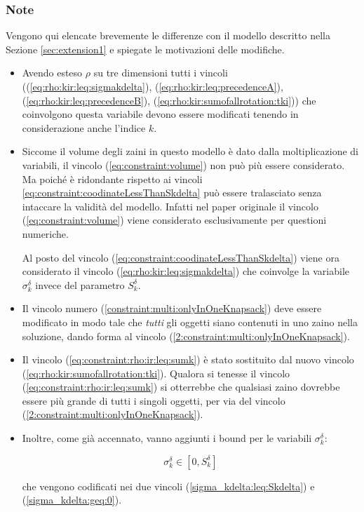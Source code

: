 \subsubsection{Note}
\label{sec:extension2:Note}
Vengono qui elencate brevemente le differenze con il modello descritto nella 
Sezione \ref{sec:extension1} e spiegate le motivazioni delle modifiche.
\begin{itemize}
\item Avendo esteso $\rho$ su tre dimensioni tutti i vincoli 
((\ref{eq:rho:kir:leq:sigmakdelta}), (\ref{eq:rho:kir:leq:precedenceA}), 
(\ref{eq:rho:kir:leq:precedenceB}), (\ref{eq:rho:kir:sumofallrotation:tki})) che
coinvolgono questa variabile devono essere modificati tenendo in considerazione
anche l'indice $k$.

\item Siccome il volume degli zaini in questo modello è dato dalla 
moltiplicazione di variabili, il vincolo
(\ref{eq:constraint:volume}) non può più essere considerato. 
Ma poiché è ridondante rispetto ai vincoli 
\ref{eq:constraint:coodinateLessThanSkdelta}
può essere tralasciato senza intaccare la validità del modello.
Infatti nel paper originale il vincolo (\ref{eq:constraint:volume}) viene 
considerato esclusivamente per questioni numeriche.

Al posto del vincolo (\ref{eq:constraint:coodinateLessThanSkdelta}) viene ora 
considerato il vincolo 
(\ref{eq:rho:kir:leq:sigmakdelta}) che coinvolge la variabile $\sigma_k^\delta$
invece del parametro $S_k^\delta$.

\item Il vincolo numero (\ref{constraint:multi:onlyInOneKnapsack}) deve essere 
modificato in modo tale che \emph{tutti} gli oggetti siano contenuti in uno 
zaino nella soluzione, dando forma al vincolo 
(\ref{2:constraint:multi:onlyInOneKnapsack}).

\item Il vincolo (\ref{eq:constraint:rho:ir:leq:sumk}) è stato sostituito dal
nuovo vincolo (\ref{eq:rho:kir:sumofallrotation:tki}). Qualora si tenesse il
vincolo (\ref{eq:constraint:rho:ir:leq:sumk}) si otterrebbe che qualsiasi zaino
 dovrebbe essere più grande di tutti i singoli oggetti, per via  del vincolo
 (\ref{2:constraint:multi:onlyInOneKnapsack}).

\item Inoltre, come già accennato, vanno aggiunti i bound per le variabili 
$\sigma_k^\delta$:

\begin{equation}
\sigma_k^\delta \in [ 0, S_k^\delta ]
\end{equation}

che vengono codificati nei due vincoli
(\ref{sigma_kdelta:leq:Skdelta}) e (\ref{sigma_kdelta:geq:0}).
\end{itemize}
